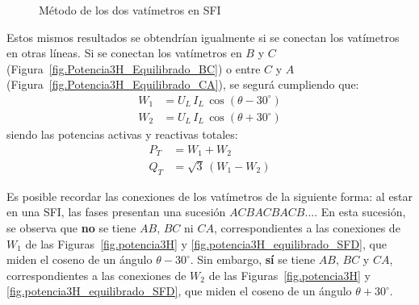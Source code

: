 \begin{figure}[H]
    \centering
    \centering{}\hfill
    \hfill
    \caption{Método de los dos vatímetros en SFI}
    \label{fig.potencia3H_equilibrado_SFI}
\end{figure}

Estos mismos resultados se obtendrían igualmente si se conectan los vatímetros en otras líneas. Si se conectan los vatímetros en $B$ y $C$ (Figura~\ref{fig.Potencia3H_Equilibrado_BC}) o entre $C$ y $A$ (Figura~\ref{fig.Potencia3H_Equilibrado_CA}), se segurá cumpliendo que: 
\begin{align*}
    W_1&=U_L\,I_L\,\cos(\theta-30^\circ) \\
    W_2&=U_L\,I_L\,\cos(\theta+30^\circ)
\end{align*}
siendo las potencias activas y reactivas totales: 
\begin{align*}
    P_T&=W_1 + W_2\\
    Q_T&=\sqrt{3}\,(W_1 - W_2)
\end{align*}

\begin{remark}
    Es posible recordar las conexiones de los vatímetros de la siguiente forma: al estar en una SFI, las fases presentan una sucesión $ACBACBACB$.... En esta sucesión, se observa que {\color{red}\textbf{no}} se tiene $AB$, $BC$ ni $CA$, correspondientes a las conexiones de $W_1$ de las Figuras~\ref{fig.potencia3H} y \ref{fig.potencia3H_equilibrado_SFD}, que miden el coseno de un ángulo $\theta-30^\circ$. Sin embargo, {\color{red}\textbf{sí}} se tiene $AB$, $BC$ y $CA$, correspondientes a las conexiones de $W_2$ de las Figuras~\ref{fig.potencia3H} y \ref{fig.potencia3H_equilibrado_SFD}, que miden el coseno de un ángulo $\theta+30^\circ$.
\end{remark}

